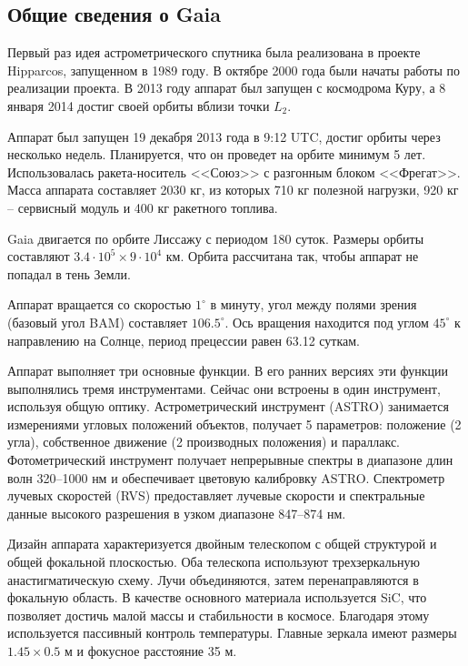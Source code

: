 \documentclass[14pt]{article} %
\begin{document}
\subsection{Общие сведения о Gaia}
Первый раз идея астрометрического спутника была реализована в проекте Hipparcos, запущенном в 1989 году. В октябре 2000 года были начаты работы по реализации проекта. В 2013 году аппарат был запущен с космодрома Куру, а 8 января 2014 достиг своей орбиты вблизи точки $L_2$.

Аппарат был запущен 19 декабря 2013 года в 9:12 UTC, достиг орбиты через несколько недель. Планируется, что он проведет на орбите минимум 5 лет. Использовалась ракета-носитель <<Союз>> с разгонным блоком <<Фрегат>>. Масса аппарата составляет 2030 кг, из которых 710 кг полезной нагрузки, 920 кг -- сервисный модуль и 400 кг ракетного топлива.

Gaia двигается по орбите Лиссажу с периодом 180 суток. Размеры орбиты составляют $3.4\cdot10^5 \times 9\cdot10^4$ км. Орбита рассчитана так, чтобы аппарат не попадал в тень Земли.

Аппарат вращается со скоростью $1^\circ$ в минуту, угол между полями зрения (базовый угол BAM) составляет $106.5^\circ$. Ось вращения находится под углом $45^\circ$ к направлению на Солнце, период прецессии равен 63.12 суткам.

Аппарат выполняет три основные функции. В его ранних версиях эти функции выполнялись тремя инструментами. Сейчас они встроены в один инструмент, используя общую оптику. Астрометрический инструмент (ASTRO) занимается измерениями угловых положений объектов, получает 5 параметров: положение (2 угла), собственное движение (2 производных положения) и параллакс. Фотометрический инструмент получает непрерывные спектры в диапазоне длин волн 320--1000 нм и обеспечивает цветовую калибровку ASTRO. Спектрометр лучевых скоростей (RVS) предоставляет лучевые скорости и спектральные данные высокого разрешения в узком диапазоне 847--874 нм.

Дизайн аппарата характеризуется двойным телескопом с общей структурой и общей фокальной плоскостью. Оба телескопа используют трехзеркальную анастигматическую схему. Лучи объединяются, затем перенаправляются в фокальную область. В качестве основного материала используется SiC, что позволяет достичь малой массы и стабильности в космосе. Благодаря этому используется пассивный контроль температуры. Главные зеркала имеют размеры $1.45\times0.5$ м и фокусное расстояние 35 м.
\end{document}
